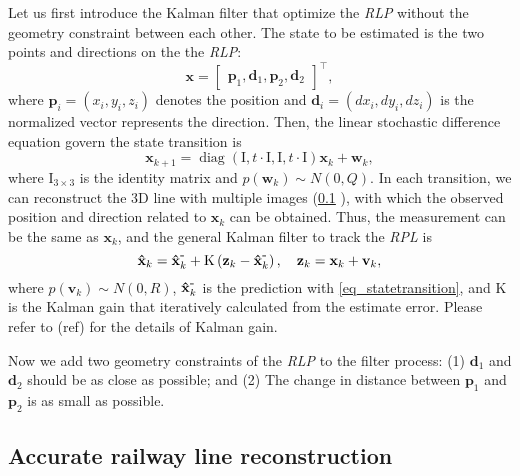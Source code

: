 Let us first introduce the Kalman filter that optimize the \textit{RLP} without the geometry constraint between each other.
The state to be estimated is the two points and directions on the the \textit{RLP}:
\begin{equation}
\mathbf{x} = \begin{bmatrix}
    \mathbf p_1,\mathbf d_1,\mathbf p_2,\mathbf d_2 
\end{bmatrix}^ \top,
\end{equation}
where $\mathbf p_i=\left(x_i, y_i, z_i\right)$ denotes the position 
and $\mathbf d_i=\left(dx_i, dy_i, dz_i\right)$ is the normalized vector represents the direction.
Then,
the linear stochastic difference equation govern the state transition is
\begin{equation}
        \mathbf{x}_{k+1}= 
        \operatorname{diag} \left(\mathrm I,t \! \cdot \! \mathrm I, \mathrm I, t \! \cdot \! \mathrm I \right) \mathbf{x}_{k} + \mathbf{w}_k,
        \label {eq_statetransition}
\end{equation}
where $\mathrm I_{3\times3}$ is the identity matrix and $p \left(\mathbf w_k \right) \sim N(0, Q)$.
In each transition,
we can reconstruct the 3D line with multiple images (\cref*{sec_linereconstruction} ),
with which the observed position and direction related to $\mathbf x_k$ can be obtained.
Thus,
the measurement can be the same as $\mathbf x_k$,
and the general Kalman filter to track the \textit{RPL} is
\begin{equation}
    \mathbf {\hat x}_k =\mathbf {\hat x}_k^{\mbox -}+ \mathrm K\left(\mathbf z_k - \mathbf {\hat x}_k^{\mbox -}\right),\quad
    \mathbf z_k = \mathbf x_k+ \mathbf v_k,
\end{equation}
where $p \left(\mathbf v_k \right) \sim N(0, R)$,
$\mathbf {\hat x}_k^{\mbox -}$ is the prediction with \cref{eq_statetransition},
and $\mathrm K$ is the Kalman gain that iteratively calculated from the estimate error.
Please refer to (ref) for the details of Kalman gain. 

Now we add two geometry constraints of the \textit{RLP} to the filter process:
(1) $\mathbf d_1$ and $\mathbf d_2$ should be as close as possible;
and (2) The change in distance between $\mathbf p_1$ and $\mathbf p_2$ is as small as possible.


\subsection{Accurate railway line reconstruction}
\label{sec_linereconstruction}


